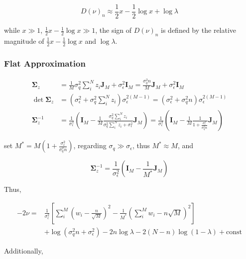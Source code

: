 \begin{equation}
    D(\nu)_n \approx \frac{1}{2}x - \frac{1}{2}\log x + \log\lambda
\end{equation}

while $x \gg 1$, $\frac{1}{2}x - \frac{1}{2}\log x \gg 1$, the sign of $D(\nu)_n$ is defined by the relative magnitude of $\frac{1}{2}x - \frac{1}{2}\log x$ and $\log\lambda$. 

\subsubsection{Flat Approximation}

\begin{equation}
\begin{aligned}
    \bm{\Sigma}_z &= \frac{1}{M}\sigma_q^2\sum_i^N z_i\bm{J}_M + \sigma_\epsilon^2\bm{I}_M = \frac{\sigma_q^2n}{M}\bm{J}_M+\sigma_\epsilon^2\bm{I}_M \\
    \det\bm{\Sigma}_z &= (\sigma_\epsilon^2 + \sigma_q^2\sum_i^N z_i)\sigma_\epsilon^{2(M-1)} = (\sigma_\epsilon^2 + \sigma_q^2n)\sigma_\epsilon^{2(M-1)} \\
    \bm{\Sigma}_z^{-1} &= \frac{1}{\sigma_\epsilon^2}(\bm{I}_M - \frac{1}{M}\frac{\sigma_q^2\sum_i^N z_i}{\sigma_q^2\sum_i^N z_i+\sigma_\epsilon^2}\bm{J}_M) = \frac{1}{\sigma_\epsilon^2}(\bm{I}_M - \frac{1}{M}\frac{1}{1+\frac{\sigma_\epsilon^2}{\sigma_q^2n}}\bm{J}_M)
\end{aligned}
\end{equation}

set $M^\ast = M(1+\frac{\sigma_\epsilon^2}{\sigma_q^2n})$, regarding $\sigma_q\gg\sigma_\epsilon$, thus $M^\ast\approx M$, and

\begin{equation}
    \bm{\Sigma}_z^{-1} = \frac{1}{\sigma_\epsilon^2}(\bm{I}_M - \frac{1}{M^\ast}\bm{J}_M)
\end{equation}

Thus, 

\begin{equation}
\begin{aligned}
    -2\nu =& \frac{1}{\sigma_\epsilon^2}[\sum_i^M(w_i-\frac{n}{\sqrt{M}})^2-\frac{1}{M^\ast}(\sum_i^M w_i-n\sqrt{M})^2] \\
    &+ \log(\sigma_q^2n+\sigma_\epsilon^2) - 2n\log\lambda - 2(N-n)\log(1-\lambda) + \mathrm{const}
\end{aligned}
\end{equation}

Additionally, 

